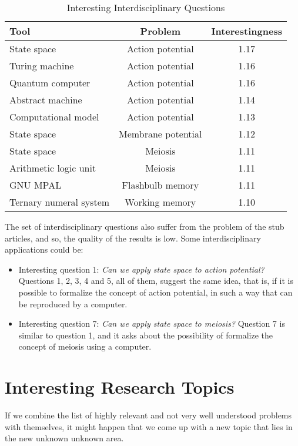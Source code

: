 \begin{table*}
\begin{centering}
\begin{tabular}{|l|c|c|}
\hline 
{Tool} & Problem & Interestingness\tabularnewline
\hline 
\hline 
State space & Action potential & 1.17\tabularnewline
\hline 
{Turing machine} & Action potential & 1.16\tabularnewline
\hline 
Quantum computer & Action potential & 1.16\tabularnewline
\hline 
Abstract machine & Action potential & 1.14\tabularnewline
\hline 
Computational model & Action potential & 1.13\tabularnewline
\hline 
State space & Membrane potential & 1.12\tabularnewline
\hline 
State space & Meiosis & 1.11\tabularnewline
\hline 
Arithmetic logic unit & Meiosis & 1.11\tabularnewline
\hline 
GNU MPAL & Flashbulb memory & 1.11\tabularnewline
\hline 
Ternary numeral system & Working memory & 1.10\tabularnewline
\hline 
\end{tabular}
\par\end{centering}

\caption{\label{tab:Interesting-Intradisciplinary-Questions-1-1}Interesting
Interdisciplinary Questions}
\end{table*}

The set of interdisciplinary questions also suffer from the problem
of the stub articles, and so, the quality of the results is low. Some
interdisciplinary applications could be:
\begin{itemize}
\item Interesting question 1: \emph{Can we apply state space to action potential?}
Questions 1, 2, 3, 4 and 5, all of them, suggest the same idea, that
is, if it is possible to formalize the concept of action potential,
in such a way that can be reproduced by a computer.
\item Interesting question 7: \emph{Can we apply state space to meiosis?}
Question 7 is similar to question 1, and it asks about the possibility
of formalize the concept of meiosis using a computer.
\end{itemize}

%
%

\section{Interesting Research Topics}

If we combine the list of highly relevant and not very well understood
problems with themselves, it might happen that we come up with a new
topic that lies in the new unknown unknown area.

